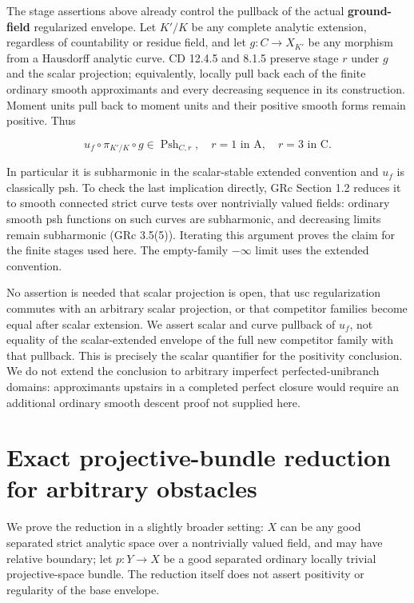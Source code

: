 \documentclass[
  11pt,
]{article}
\begin{document}
The stage assertions above already control the pullback of the actual
\textbf{ground-field} regularized envelope. Let \(K'/K\) be any complete
analytic extension, regardless of countability or residue field, and let
\(g:C\to X_{K'}\) be any morphism from a Hausdorff analytic curve. CD
12.4.5 and 8.1.5 preserve stage \(r\) under \(g\) and the scalar
projection; equivalently, locally pull back each of the finite ordinary
smooth approximants and every decreasing sequence in its construction.
Moment units pull back to moment units and their positive smooth forms
remain positive. Thus

\[
u_f\circ\pi_{K'/K}\circ g\in\operatorname{Psh}_{C,r},
\quad r=1\text{ in A},\quad r=3\text{ in C}.
\]

In particular it is subharmonic in the scalar-stable extended convention
and \(u_f\) is classically psh. To check the last implication directly,
GRc Section 1.2 reduces it to smooth connected strict curve tests over
nontrivially valued fields: ordinary smooth psh functions on such curves
are subharmonic, and decreasing limits remain subharmonic (GRc 3.5(5)).
Iterating this argument proves the claim for the finite stages used
here. The empty-family \(-\infty\) limit uses the extended convention.

No assertion is needed that scalar projection is open, that usc
regularization commutes with an arbitrary scalar projection, or that
competitor families become equal after scalar extension. We assert
scalar and curve pullback of \textbf{\(u_f\)}, not equality of the
scalar-extended envelope of the full new competitor family with that
pullback. This is precisely the scalar quantifier for the positivity
conclusion. We do not extend the conclusion to arbitrary imperfect
perfected-unibranch domains: approximants upstairs in a completed
perfect closure would require an additional ordinary smooth descent
proof not supplied here.

\section{Exact projective-bundle reduction for arbitrary
obstacles}\label{exact-projective-bundle-reduction-for-arbitrary-obstacles}

We prove the reduction in a slightly broader setting: \(X\) can be any
good separated strict analytic space over a nontrivially valued field,
and may have relative boundary; let \(p:Y\to X\) be a good separated
ordinary locally trivial projective-space bundle. The reduction itself
does not assert positivity or regularity of the base envelope.
\end{document}
